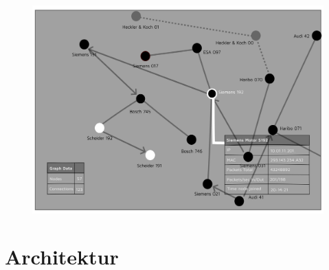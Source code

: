 \documentclass[18pt]{beamer}
\begin{document}
\begin{frame}
	\begin{figure}
		\includegraphics[height=0.95\textheight]{./images/GUI.png}
	\end{figure}
\end{frame}


\section{Architektur}
	
	
	
	
	
	
	
	
	
	
	
	
	
	
	
	
	
	
	
	
\end{document}
